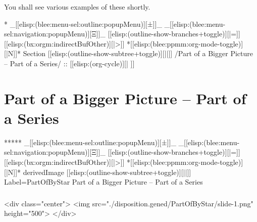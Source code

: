 \begin{whenOrg}
\begin{verblatex}
\begin{frame}[fragile,plain,label=novelConcepts]
{  You shall see various examples of these shortly.

}

\end{frame}
\end{verblatex}



\begin{whenOrg}
*  _[[elisp:(blee:menu-sel:outline:popupMenu)][±]]_ _[[elisp:(blee:menu-sel:navigation:popupMenu)][Ξ]]_ [[elisp:(outline-show-branches+toggle)][|=]] [[elisp:(bx:orgm:indirectBufOther)][|>]] *[[elisp:(blee:ppmm:org-mode-toggle)][|N]]*  Section    [[elisp:(outline-show-subtree+toggle)][||]]   /Part of a Bigger Picture -- Part of a Series/ ::  [[elisp:(org-cycle)][| ]]
\end{whenOrg}

\section{Part of a Bigger Picture -- Part of a Series}

\begin{whenOrg}
*****  _[[elisp:(blee:menu-sel:outline:popupMenu)][±]]_ _[[elisp:(blee:menu-sel:navigation:popupMenu)][Ξ]]_ [[elisp:(outline-show-branches+toggle)][|=]] [[elisp:(bx:orgm:indirectBufOther)][|>]] *[[elisp:(blee:ppmm:org-mode-toggle)][|N]]*  derivedImage [[elisp:(outline-show-subtree+toggle)][||]] Label=PartOfByStar Part of a Bigger Picture -- Part of a Series
\end{whenOrg}

\begin{htmlonly}

\begin{frame}[fragile,plain,label=PartOfByStar]
    \frametitle{}
    \framesubtitle{}
    \begin{rawhtml}
<div class="center">
<img src="./disposition.gened/PartOfByStar/slide-1.png" height="500">
</div>
    \end{rawhtml}
\end{frame}
\end{htmlonly}


\end{whenOrg}
